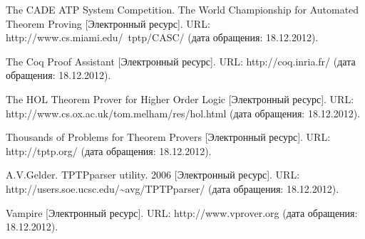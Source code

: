 \begin{thebibliography}{99}
 The CADE ATP System Competition. The World Championship for Automated Theorem Proving [Электронный ресурс]. URL: http://www.cs.miami.edu/~tptp/CASC/ (дата обращения: 18.12.2012).

 The Coq Proof Assistant [Электронный ресурс]. URL: http://coq.inria.fr/ (дата обращения: 18.12.2012).

 The HOL Theorem Prover for Higher Order Logic [Электронный ресурс]. URL: http://www.cs.ox.ac.uk/tom.melham/res/hol.html (дата обращения: 18.12.2012).

 Thousands of Problems for Theorem Provers [Электронный ресурс]. URL: http://tptp.org/ (дата обращения: 18.12.2012).

 A.V.Gelder. TPTPparser utility. 2006 [Электронный ресурс]. URL: http://users.soe.ucsc.edu/\~{}avg/TPTPparser/ (дата обращения: 18.12.2012).

 Vampire [Электронный ресурс]. URL: http://www.vprover.org (дата обращения: 18.12.2012).








\end{thebibliography}



